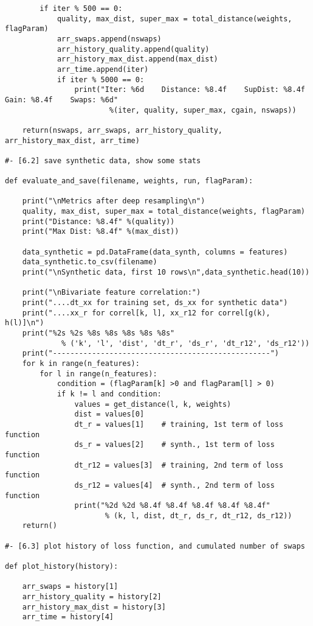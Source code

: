 \documentclass[oneside,10pt]{book}
\begin{document}
\begin{lstlisting}
        if iter % 500 == 0:
            quality, max_dist, super_max = total_distance(weights, flagParam)
            arr_swaps.append(nswaps)
            arr_history_quality.append(quality)
            arr_history_max_dist.append(max_dist)
            arr_time.append(iter)
            if iter % 5000 == 0:
                print("Iter: %6d    Distance: %8.4f    SupDist: %8.4f    Gain: %8.4f    Swaps: %6d"
                        %(iter, quality, super_max, cgain, nswaps))

    return(nswaps, arr_swaps, arr_history_quality, arr_history_max_dist, arr_time)

#- [6.2] save synthetic data, show some stats

def evaluate_and_save(filename, weights, run, flagParam):

    print("\nMetrics after deep resampling\n")
    quality, max_dist, super_max = total_distance(weights, flagParam)
    print("Distance: %8.4f" %(quality))
    print("Max Dist: %8.4f" %(max_dist))

    data_synthetic = pd.DataFrame(data_synth, columns = features)
    data_synthetic.to_csv(filename)
    print("\nSynthetic data, first 10 rows\n",data_synthetic.head(10))

    print("\nBivariate feature correlation:")
    print("....dt_xx for training set, ds_xx for synthetic data")
    print("....xx_r for correl[k, l], xx_r12 for correl[g(k), h(l)]\n")
    print("%2s %2s %8s %8s %8s %8s %8s"
             % ('k', 'l', 'dist', 'dt_r', 'ds_r', 'dt_r12', 'ds_r12'))
    print("--------------------------------------------------")
    for k in range(n_features):
        for l in range(n_features):
            condition = (flagParam[k] >0 and flagParam[l] > 0)
            if k != l and condition:
                values = get_distance(l, k, weights)
                dist = values[0]
                dt_r = values[1]    # training, 1st term of loss function
                ds_r = values[2]    # synth., 1st term of loss function
                dt_r12 = values[3]  # training, 2nd term of loss function
                ds_r12 = values[4]  # synth., 2nd term of loss function
                print("%2d %2d %8.4f %8.4f %8.4f %8.4f %8.4f"
                       % (k, l, dist, dt_r, ds_r, dt_r12, ds_r12))
    return()

#- [6.3] plot history of loss function, and cumulated number of swaps

def plot_history(history):

    arr_swaps = history[1]
    arr_history_quality = history[2]
    arr_history_max_dist = history[3]
    arr_time = history[4]


\end{lstlisting}
\end{document}
